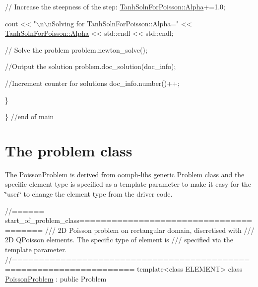 \begin{DoxyCodeInclude}
   \textcolor{comment}{// Increase the steepness of the step:}
   \hyperlink{namespaceTanhSolnForPoisson_ae676ccd186d5df119cce811596d949c1}{TanhSolnForPoisson::Alpha}+=1.0;

   cout << \textcolor{stringliteral}{"\(\backslash\)n\(\backslash\)nSolving for TanhSolnForPoisson::Alpha="}
        << \hyperlink{namespaceTanhSolnForPoisson_ae676ccd186d5df119cce811596d949c1}{TanhSolnForPoisson::Alpha} << std::endl << std::endl;

   \textcolor{comment}{// Solve the problem}
   problem.newton\_solve();

   \textcolor{comment}{//Output the solution}
   problem.doc\_solution(doc\_info);
 
   \textcolor{comment}{//Increment counter for solutions }
   doc\_info.number()++;
 
  \}


\} \textcolor{comment}{//end of main}

\end{DoxyCodeInclude}




 

\hypertarget{index_problem}{}\section{The problem class}\label{index_problem}
The {\ttfamily \hyperlink{classPoissonProblem}{Poisson\+Problem}} is derived from {\ttfamily oomph-\/lib\textquotesingle{}s} generic {\ttfamily Problem} class and the specific element type is specified as a template parameter to make it easy for the \char`\"{}user\char`\"{} to change the element type from the driver code.

 
\begin{DoxyCodeInclude}
\textcolor{comment}{//====== start\_of\_problem\_class=======================================}
\textcolor{comment}{/// 2D Poisson problem on rectangular domain, discretised with}
\textcolor{comment}{}\textcolor{comment}{/// 2D QPoisson elements. The specific type of element is}
\textcolor{comment}{}\textcolor{comment}{/// specified via the template parameter.}
\textcolor{comment}{}\textcolor{comment}{//====================================================================}
\textcolor{keyword}{template}<\textcolor{keyword}{class} ELEMENT> 
\textcolor{keyword}{class }\hyperlink{classPoissonProblem}{PoissonProblem} : \textcolor{keyword}{public} Problem

\end{DoxyCodeInclude}



